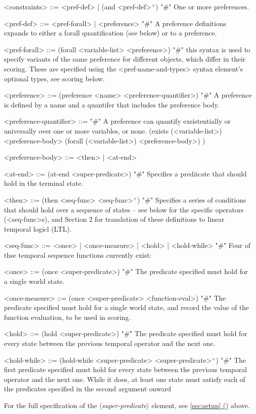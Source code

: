 \documentclass{article}
\newcommand{\dsl}[1]{{\it $\langle$#1$\rangle$}}
\newcommand*{\fullref}[1]{\hyperref[{#1}]{\autoref*{#1} (\nameref*{#1})}} %
\begin{document}
\begin{grammar}
<constraints> ::= <pref-def> | (and <pref-def>$^+$)  "#" One or more preferences.

<pref-def> ::= <pref-forall> | <preference> "#" A preference definitions expands to either a forall quantification (see below) or to a preference.

<pref-forall> ::= (forall <variable-list> <preference>) "#" this syntax is used to specify variants of the same preference for different objects, which differ in their scoring. These are specified using the <pref-name-and-types> syntax element's optional types, see scoring below.

<preference> ::= (preference <name> <preference-quantifier>) "#" A preference is defined by a name and a quantifer that includes the preference body.

<preference-quantifier> ::= "#" A preference can quantify exsistentially or universally over one or more variables, or none.
\alt (exists (<variable-list>) <preference-body>
\alt  (forall (<variable-list>) <preference-body>)
)

<preference-body> ::=  <then> | <at-end>

<at-end> ::= (at-end <super-predicate>) "#" Specifies a prediicate that should hold in the terminal state.

<then> ::= (then <seq-func> <seq-func>$^+$) "#" Specifies a series of conditions that should hold over a sequence of states -- see below for the specific operators (<seq-func>s), and Section 2 for translation of these definitions to linear temporal logicl (LTL).

<seq-func> ::= <once> | <once-measure> | <hold> | <hold-while> "#" Four of thse temporal sequence functions currently exist:

<once> ::= (once <super-predicate>) "#" The predicate specified must hold for a single world state.

<once-measure> ::= (once <super-predicate> <function-eval>) "#" The predicate specified must hold for a single world state, and record the value of the function evaluation, to be used in scoring.

<hold> ::= (hold <super-predicate>) "#" The predicate specified must hold for every state between the previous temporal operator and the next one.

<hold-while> ::= (hold-while <super-predicate> <super-predicate>$^+$) "#" The first predicate specified must hold for every state between the previous temporal operator and the next one. While it does, at least one state must satisfy each of the predicates specified in the second argument onward



\end{grammar}
For the full specification of the \dsl{super-predicate} element, see \fullref{sec:setup} above.
\end{document}
